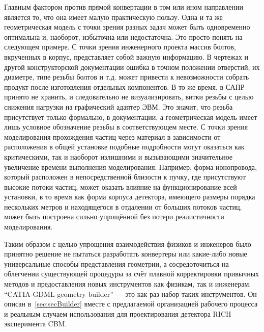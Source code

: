 Главным фактором против прямой конвертации в том или ином направлении является то, что она имеет малую практическую пользу. Одна и та же геометрическая модель с точки зрения разных задач может быть одновременно оптимальна и, наоборот, избыточна или недостаточна. Это просто понять на следующем примере. С точки зрения инженерного проекта массив болтов, вкрученных в корпус, представляет собой важную информацию. В чертежах и другой конструкторской документации ошибка в точном положении отверстий, их диаметре, типе резьбы болтов и т.д. может привести к невозможности собрать продукт после изготовления отдельных компонентов. В то же время, в САПР принято не хранить, и следовательно не визуализировать, витки резьбы с целью снижения нагрузки на графический адаптер ЭВМ. Это значит, что резьба присутствует только формально, в документации, а геометрическая модель имеет лишь условное обозначение резьбы в соответствующем месте. С точки зрения моделирования прохождения частиц через материал в зависимости от расположения в общей установке подобные подробности могут оказаться как критическими, так и наоборот излишними и вызывающими значительное увеличение времени выполнения моделирования.
Например, форма ионопровода, который расположен в непосредственной близости к пучку, где присутствуют высокие потоки частиц, может оказать влияние на функционирование всей установки, в то время как форма корпуса детектора, имеющего размеры порядка нескольких метров и находящегося в отдалении от больших потоков частиц, может быть построена сильно упрощённой без потери реалистичности моделирования.

Таким образом с целью упрощения взаимодействия физиков и инженеров было принятно решение не пытаться разработать конвертеры или какие-либо новые универсальные способы представления геометрии, а сосредоточиться на облегчении существующей процедуры за счёт плавной корректировки привычных методов и предоставления новых инструментов как физикам, так и инженерам. ``CATIA-GDML geometry builder'' --- это как раз набор таких инструментов. Он описан в~\ref{sec:secBuilder} вместе с предлагаемой организацией рабочего процесса и реальным случаем использования для проектирования детектора RICH эксперимента CBM.





